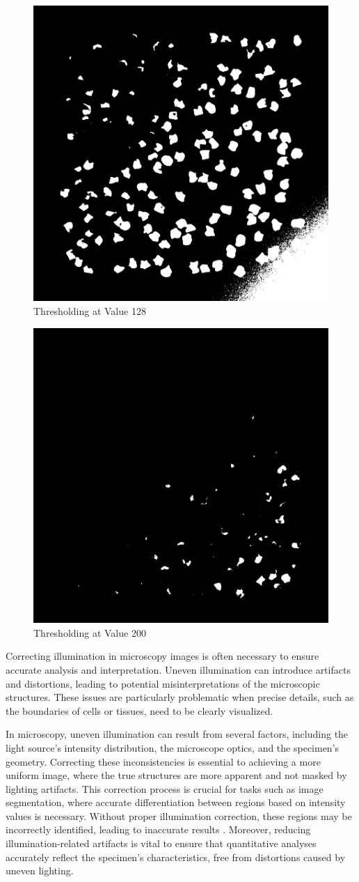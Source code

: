 \documentclass[%
	a4paper, %
	12pt, %
	english, %
	bibtotoc %
]{scrartcl}
\begin{document}
\begin{figure}[h!]
    \centering
    \includegraphics[width=0.3\linewidth]{latex-template-ss24/images/128_threshold.png}
    \caption{Thresholding at Value 128}
    \label{fig:figure128thresholding}
\end{figure}

\begin{figure}[h!]
    \centering
    \includegraphics[width=0.3\linewidth]{latex-template-ss24/images/200_threshold.png}
    \caption{Thresholding at Value 200}
    \label{fig:figure200thresholding}
\end{figure}

Correcting illumination in microscopy images is often necessary to ensure accurate analysis and interpretation. Uneven illumination can introduce artifacts and distortions, leading to potential misinterpretations of the microscopic structures. These issues are particularly problematic when precise details, such as the boundaries of cells or tissues, need to be clearly visualized.

In microscopy, uneven illumination can result from several factors, including the light source's intensity distribution, the microscope optics, and the specimen's geometry. Correcting these inconsistencies is essential to achieving a more uniform image, where the true structures are more apparent and not masked by lighting artifacts. This correction process is crucial for tasks such as image segmentation, where accurate differentiation between regions based on intensity values is necessary. Without proper illumination correction, these regions may be incorrectly identified, leading to inaccurate results \cite{leong2003correction}. Moreover, reducing illumination-related artifacts is vital to ensure that quantitative analyses accurately reflect the specimen's characteristics, free from distortions caused by uneven lighting.
\end{document}
